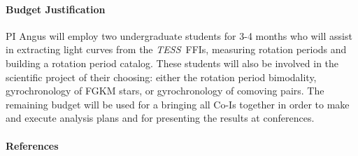 \documentclass[letterpaper,12pt,preprint]{hack_aastex}
\newcommand{\tess}{{\it TESS}}
\begin{document}
\paragraph{Budget Justification}
PI Angus will employ two undergraduate students for 3-4 months who will assist
in extracting light curves from the \tess\ FFIs, measuring rotation periods
and building a rotation period catalog.
These students will also be involved in the scientific project of their
choosing: either the rotation period bimodality, gyrochronology of FGKM stars,
or gyrochronology of comoving pairs.
The remaining budget will be used for a bringing all Co-Is together in order
to make and execute analysis plans and for presenting the results at
conferences.
\paragraph{References}

{\footnotesize

}
\end{document}
